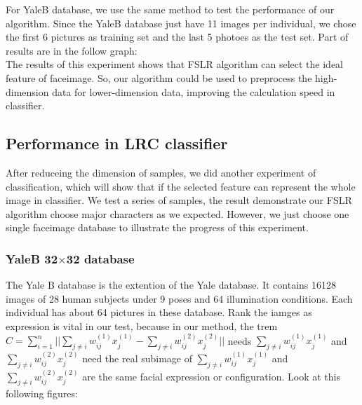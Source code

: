 \documentclass[10pt,journal,final,twocolumn,]{IEEEtran}
\begin{document}
	
	
	For YaleB database, we use the same method to test the performance of our algorithm. Since the YaleB database just have 11 images per individual, we chose the first 6 pictures as training set and the last 5 photoes as the test set. Part of results are in the follow graph:
	\\
	
	The results of this experiment shows that FSLR algorithm can select the ideal feature of faceimage. So, our algorithm could be used to preprocess the high-dimension data for lower-dimension data, improving the calculation speed in classifier.
	
	\subsection{\textbf{Performance in LRC classifier}}
	After reduceing the dimension of samples, we did another experiment of classification, which will show that if the selected feature can represent the whole image in classifier. We test a series of samples,  the result demonstrate our FSLR algorithm choose major characters as we expected.  However, we just choose one single faceimage database to illustrate the progress of this experiment.
	\subsubsection{\textbf{YaleB 32$\times$32 database}}
	The Yale B database is the extention of the Yale database. It contains 16128 images of 28 human subjects under 9 poses and 64 illumination conditions. Each individual has about 64 pictures in these database. Rank the iamges as expression is vital in our test, because in our method, the trem $C=\sum_{i=1}^{n} ||\sum_{j \neq i} w_{ij}^{(1)}x_{j}^{(1)}-\sum_{j \neq i} w_{ij}^{(2)}x_{j}^{(2)}|| $ needs $\sum_{j \neq i} w_{ij}^{(1)}x_{j}^{(1)}$ and $\sum_{j \neq i} w_{ij}^{(2)}x_{j}^{(2)}$ need the real subimage of $\sum_{j \neq i} w_{ij}^{(1)}x_{j}^{(1)}$ and $\sum_{j \neq i} w_{ij}^{(2)}x_{j}^{(2)}$ are the same facial expression or configuration. Look at this following figures:
	
\end{document}
